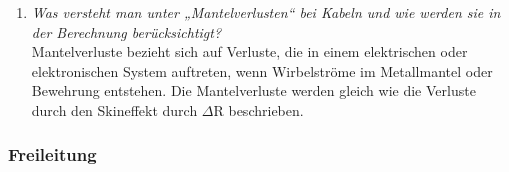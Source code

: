 \documentclass[12pt]{article}
\begin{document}
\begin{enumerate}
    \item \textit{Was versteht man unter „Mantelverlusten“ bei 
    Kabeln und wie werden sie in der Berechnung 
    berücksichtigt?}\\
    Mantelverluste bezieht sich auf Verluste, 
    die in einem elektrischen oder elektronischen System auftreten, 
    wenn Wirbelströme im Metallmantel oder Bewehrung entstehen.
    Die Mantelverluste werden gleich wie die Verluste durch den Skineffekt durch $\Delta$R beschrieben.


\end{enumerate}

\subsubsection{Freileitung}
\end{document}
